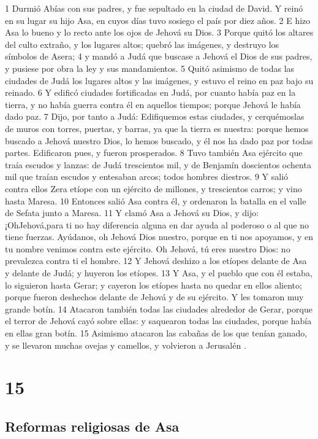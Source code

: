 1 Durmió Abías con sus padres, y fue sepultado en la ciudad de David. Y reinó en su lugar su hijo Asa, en cuyos días tuvo sosiego el país por diez años.
2 E hizo Asa lo bueno y lo recto ante los ojos de Jehová su Dios.
3 Porque quitó los altares del culto extraño, y los lugares altos; quebró las imágenes, y destruyo los símbolos de Asera;
4 y mandó a Judá que buscase a Jehová el Dios de sus padres, y pusiese por obra la ley y sus mandamientos.
5 Quitó asimismo de todas las ciudades de Judá los lugares altos y las imágenes, y estuvo el reino en paz bajo su reinado. 
6 Y edificó ciudades fortificadas en Judá, por cuanto había paz en la tierra, y no había guerra contra él en aquellos tiempos; porque Jehová le había dado paz.
7 Dijo, por tanto a Judá: Edifiquemos estas ciudades, y cerquémoslas de muros con torres, puertas, y barras, ya que la tierra es nuestra: porque hemos buscado a Jehová nuestro Dios, lo hemos buscado, y él nos ha dado paz por todas partes. Edificaron pues, y fueron prosperados.
8 Tuvo también Asa ejército que traía escudos y lanzas: de Judá trescientos mil, y de Benjamín doscientos ochenta mil que traían escudos y entesaban arcos; todos hombres diestros.
9 Y salió contra ellos Zera etíope con un ejército de millones, y trescientos carros; y vino hasta Maresa.
10 Entonces salió Asa contra él, y ordenaron la batalla en el valle de Sefata junto a Maresa.
11 Y clamó Asa a Jehová su Dios, y dijo: ¡OhJehová,para ti no hay diferencia alguna en dar ayuda al poderoso o al que no tiene fuerzas. Ayúdanos, oh Jehová Dios nuestro, porque en ti nos apoyamos, y en tu nombre venimos contra este ejército. Oh Jehová, tú eres nuestro Dios: no prevalezca contra ti el hombre.
12 Y Jehová deshizo a los etíopes delante de Asa y delante de Judá; y huyeron los etíopes.
13 Y Asa, y el pueblo que con él estaba, lo siguieron hasta Gerar; y cayeron los etíopes hasta no quedar en ellos aliento; porque fueron deshechos delante de Jehová y de su ejército. Y les tomaron muy grande botín.
14 Atacaron también todas las ciudades alrededor de Gerar, porque el terror de Jehová cayó sobre ellas: y saquearon todas las ciudades, porque había en ellas gran botín.
15 Asimismo atacaron las cabañas de los que tenían ganado, y se llevaron muchas ovejas y camellos, y volvieron a Jerusalén .

\chapter{15}

\section*{Reformas religiosas de Asa }


